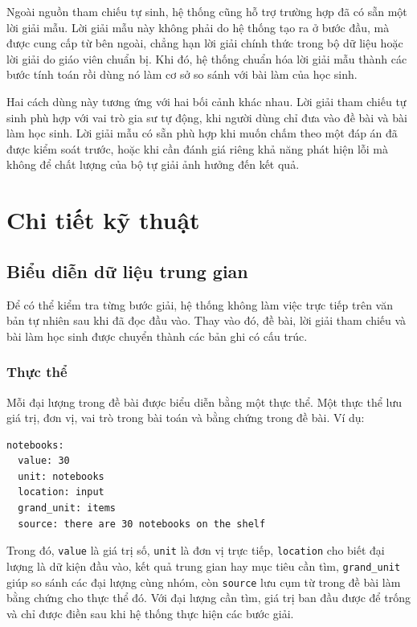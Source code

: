 \documentclass[12pt,a4paper]{article}
\begin{document}
Ngoài nguồn tham chiếu tự sinh, hệ thống cũng hỗ trợ trường hợp đã có sẵn một
lời giải mẫu. Lời giải mẫu này không phải do hệ thống tạo ra ở bước đầu, mà được
cung cấp từ bên ngoài, chẳng hạn lời giải chính thức trong bộ dữ liệu hoặc lời
giải do giáo viên chuẩn bị. Khi đó, hệ thống chuẩn hóa lời giải mẫu thành các
bước tính toán rồi dùng nó làm cơ sở so sánh với bài làm của học sinh.

Hai cách dùng này tương ứng với hai bối cảnh khác nhau. Lời giải tham chiếu tự
sinh phù hợp với vai trò gia sư tự động, khi người dùng chỉ đưa vào đề bài và bài
làm học sinh. Lời giải mẫu có sẵn phù hợp khi muốn chấm theo một đáp án đã được
kiểm soát trước, hoặc khi cần đánh giá riêng khả năng phát hiện lỗi mà không để
chất lượng của bộ tự giải ảnh hưởng đến kết quả.

\section{Chi tiết kỹ thuật}

\subsection{Biểu diễn dữ liệu trung gian}

Để có thể kiểm tra từng bước giải, hệ thống không làm việc trực tiếp trên văn
bản tự nhiên sau khi đã đọc đầu vào. Thay vào đó, đề bài, lời giải tham chiếu và
bài làm học sinh được chuyển thành các bản ghi có cấu trúc.

\subsubsection{Thực thể}

Mỗi đại lượng trong đề bài được biểu diễn bằng một thực thể. Một thực thể lưu
giá trị, đơn vị, vai trò trong bài toán và bằng chứng trong đề bài. Ví dụ:

\begin{verbatim}
notebooks:
  value: 30
  unit: notebooks
  location: input
  grand_unit: items
  source: there are 30 notebooks on the shelf
\end{verbatim}

Trong đó, \texttt{value} là giá trị số, \texttt{unit} là đơn vị trực tiếp,
\texttt{location} cho biết đại lượng là dữ kiện đầu vào, kết quả trung gian hay
mục tiêu cần tìm, \texttt{grand\_unit} giúp so sánh các đại lượng cùng nhóm, còn
\texttt{source} lưu cụm từ trong đề bài làm bằng chứng cho thực thể đó. Với đại
lượng cần tìm, giá trị ban đầu được để trống và chỉ được điền sau khi hệ thống
thực hiện các bước giải.
\end{document}
